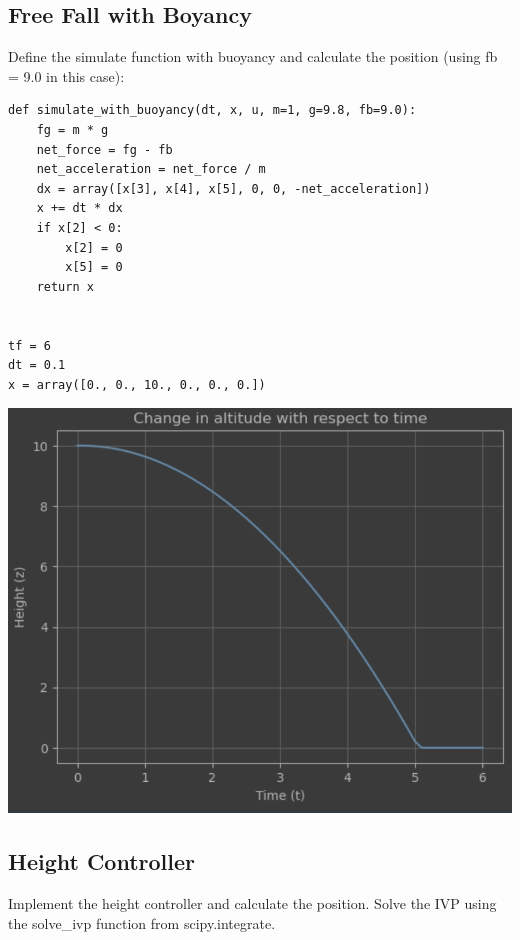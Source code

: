 \documentclass[letterpaper, 10 pt, conference]{ieeeconf}  %
\begin{document}
    \subsection{Free Fall with Boyancy}

    Define the simulate function with buoyancy and calculate the position (using fb = 9.0 in this case):

    \begin{lstlisting}[label={lst:lstlisting5}]
def simulate_with_buoyancy(dt, x, u, m=1, g=9.8, fb=9.0):
    fg = m * g
    net_force = fg - fb
    net_acceleration = net_force / m
    dx = array([x[3], x[4], x[5], 0, 0, -net_acceleration])
    x += dt * dx
    if x[2] < 0:
        x[2] = 0
        x[5] = 0
    return x


tf = 6
dt = 0.1
x = array([0., 0., 10., 0., 0., 0.])
    \end{lstlisting}

    \begin{center}
        \includegraphics[scale=0.4]{2-2}
    \end{center}

    \subsection{Height Controller}

    Implement the height controller and calculate the position.
    Solve the IVP using the solve\_ivp function from scipy.integrate.
\end{document}
